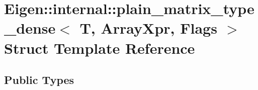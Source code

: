 \hypertarget{struct_eigen_1_1internal_1_1plain__matrix__type__dense_3_01_t_00_01_array_xpr_00_01_flags_01_4}{}\section{Eigen\+:\+:internal\+:\+:plain\+\_\+matrix\+\_\+type\+\_\+dense$<$ T, Array\+Xpr, Flags $>$ Struct Template Reference}
\label{struct_eigen_1_1internal_1_1plain__matrix__type__dense_3_01_t_00_01_array_xpr_00_01_flags_01_4}
\subsection*{Public Types}
